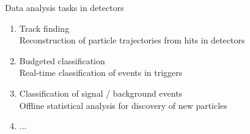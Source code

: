 \documentclass{beamer}
\begin{document}

\begin{frame}{Data analysis tasks in detectors}
\begin{enumerate}

\item Track finding\\
    {\scriptsize Reconstruction of particle trajectories from hits in detectors}

    \vspace{0.5cm}

\item Budgeted classification\\
    {\scriptsize Real-time classification of events in triggers}

    \vspace{0.5cm}

\item Classification of signal / background events\\
    {\scriptsize Offline statistical analysis for discovery of new particles}

    \vspace{0.5cm}

\item ...

\end{enumerate}
\end{frame}

\end{document}
